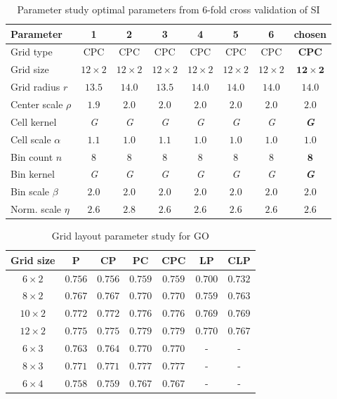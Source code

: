 \documentclass[thesis.tex]{subfiles}
\begin{document}
\begin{table}[p]
{\begin{tabular}{ l c c c c c c c}
Parameter & 1 & 2 & 3 & 4 & 5 & 6 & chosen \\ \midrule
Grid type & CPC & CPC & CPC & CPC & CPC & CPC & \textbf{CPC} \\
Grid size & $12 \times 2$ & $12 \times 2$ & $12 \times 2$ & $12 \times 2$ & $12 \times 2$ & $12 \times 2$ & \textbf{$\mathbf{12 \times 2}$} \\
Grid radius $r$ & $13.5$ & $14.0$ & $13.5$ & $14.0$ & $14.0$ & $14.0$ & $\mathbf{14.0}$ \\
Center scale $\rho$ & $1.9$ & $2.0$ & $2.0$ & $2.0$ & $2.0$ & $2.0$ & $\mathbf{2.0}$ \\
Cell kernel & \textit{G} & \textit{G} & \textit{G} & \textit{G} & \textit{G} & \textit{G} & \textbf{\textit{G}} \\
Cell scale $\alpha$ & $1.1$ & $1.0$ & $1.1$ & $1.0$ & $1.0$ & $1.0$ & $\mathbf{1.0}$ \\
Bin count $n$ & $8$ & $8$ & $8$ & $8$ & $8$ & $8$ & $\mathbf{8}$ \\
Bin kernel & \textit{G} & \textit{G} & \textit{G} & \textit{G} & \textit{G} & \textit{G} & \textbf{\textit{G}} \\
Bin scale $\beta$ & $2.0$ & $2.0$ & $2.0$ & $2.0$ & $2.0$ & $2.0$ & $\mathbf{2.0}$ \\
Norm. scale $\eta$ & $2.6$ & $2.8$ & $2.6$ & $2.6$ & $2.6$ & $2.6$ & $\mathbf{2.6}$ \\
\bottomrule
\end{tabular}}
\caption{Parameter study optimal parameters from 6-fold cross validation of SI}
\label{fig:ICparamsSi}
\end{table}
%
\begin{table}[tb]
\centering
\begin{tabular}{ c c c c c c c }
\toprule
Grid size & P & CP & PC & CPC & LP & CLP \\ \midrule
$6 \times 2$ & $0.756$ & $0.756$ & $0.759$ & $0.759$ & $0.700$ & $0.732$ \\ 
$8 \times 2$ & $0.767$ & $0.767$ & $0.770$ & $0.770$ & $0.759$ & $0.763$ \\ 
$10 \times 2$ & $0.772$ & $0.772$ & $0.776$ & $0.776$ & $0.769$ & $0.769$ \\ 
$12 \times 2$ & $0.775$ & $0.775$ & $\mathbf{0.779}$ & $0.779$ & $0.770$ & $0.767$ \\ 
$6 \times 3$ & $0.763$ & $0.764$ & $0.770$ & $0.770$ & - & - \\ 
$8 \times 3$ & $0.771$ & $0.771$ & $0.777$ & $0.777$ & - & - \\ 
$6 \times 4$ & $0.758$ & $0.759$ & $0.767$ & $0.767$ & - & - \\ 
\bottomrule
\end{tabular}
\caption{Grid layout parameter study for GO}
\label{tbl:dtuLayoutParametersGo}
\end{table}
\end{document}
